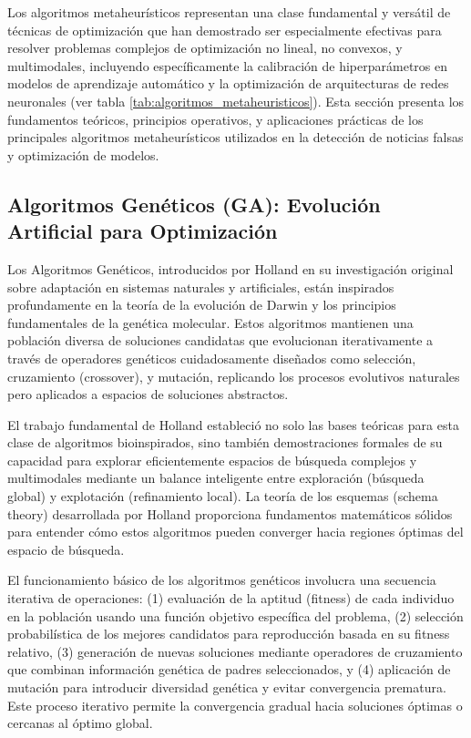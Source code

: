 Los algoritmos metaheurísticos representan una clase fundamental y versátil de técnicas de optimización que han demostrado ser especialmente efectivas para resolver problemas complejos de optimización no lineal, no convexos, y multimodales, incluyendo específicamente la calibración de hiperparámetros en modelos de aprendizaje automático y la optimización de arquitecturas de redes neuronales (ver tabla \ref{tab:algoritmos_metaheuristicos}). Esta sección presenta los fundamentos teóricos, principios operativos, y aplicaciones prácticas de los principales algoritmos metaheurísticos utilizados en la detección de noticias falsas y optimización de modelos.

\subsection{Algoritmos Genéticos (GA): Evolución Artificial para Optimización}

Los Algoritmos Genéticos, introducidos por Holland \cite{holland1992adaptation} en su investigación original sobre adaptación en sistemas naturales y artificiales, están inspirados profundamente en la teoría de la evolución de Darwin y los principios fundamentales de la genética molecular. Estos algoritmos mantienen una población diversa de soluciones candidatas que evolucionan iterativamente a través de operadores genéticos cuidadosamente diseñados como selección, cruzamiento (crossover), y mutación, replicando los procesos evolutivos naturales pero aplicados a espacios de soluciones abstractos.

El trabajo fundamental de Holland estableció no solo las bases teóricas para esta clase de algoritmos bioinspirados, sino también demostraciones formales de su capacidad para explorar eficientemente espacios de búsqueda complejos y multimodales mediante un balance inteligente entre exploración (búsqueda global) y explotación (refinamiento local). La teoría de los esquemas (schema theory) desarrollada por Holland proporciona fundamentos matemáticos sólidos para entender cómo estos algoritmos pueden converger hacia regiones óptimas del espacio de búsqueda.

El funcionamiento básico de los algoritmos genéticos involucra una secuencia iterativa de operaciones: (1) evaluación de la aptitud (fitness) de cada individuo en la población usando una función objetivo específica del problema, (2) selección probabilística de los mejores candidatos para reproducción basada en su fitness relativo, (3) generación de nuevas soluciones mediante operadores de cruzamiento que combinan información genética de padres seleccionados, y (4) aplicación de mutación para introducir diversidad genética y evitar convergencia prematura. Este proceso iterativo permite la convergencia gradual hacia soluciones óptimas o cercanas al óptimo global.

